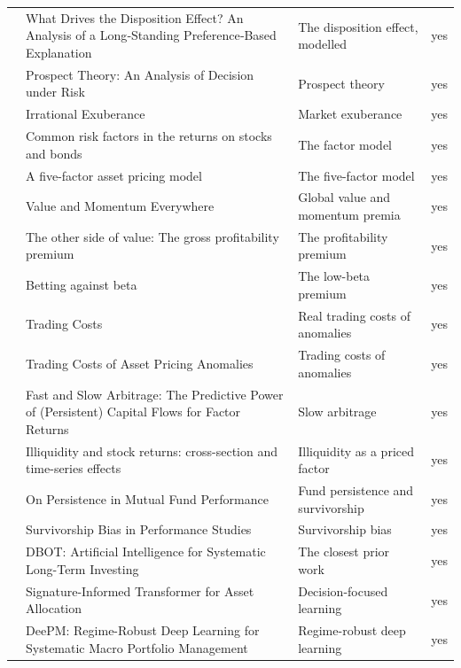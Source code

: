 \begin{tabular}{@{}P{1.32in}P{2.00in}P{0.92in}P{0.36in}@{}}
 & What Drives the Disposition Effect? An Analysis of a Long‐Standing Preference‐Based Explanation & The disposition effect, modelled & yes \\
 & Prospect Theory: An Analysis of Decision under Risk & Prospect theory & yes \\
 & Irrational Exuberance & Market exuberance & yes \\
 & Common risk factors in the returns on stocks and bonds & The factor model & yes \\
 & A five-factor asset pricing model & The five-factor model & yes \\
 & Value and Momentum Everywhere & Global value and momentum premia & yes \\
 & The other side of value: The gross profitability premium & The profitability premium & yes \\
 & Betting against beta & The low-beta premium & yes \\
 & Trading Costs & Real trading costs of anomalies & yes \\
 & Trading Costs of Asset Pricing Anomalies & Trading costs of anomalies & yes \\
 & Fast and Slow Arbitrage: The Predictive Power of (Persistent) Capital Flows for Factor Returns & Slow arbitrage & yes \\
 & Illiquidity and stock returns: cross-section and time-series effects & Illiquidity as a priced factor & yes \\
 & On Persistence in Mutual Fund Performance & Fund persistence and survivorship & yes \\
 & Survivorship Bias in Performance Studies & Survivorship bias & yes \\
 & DBOT: Artificial Intelligence for Systematic Long-Term Investing & The closest prior work & yes \\
 & Signature-Informed Transformer for Asset Allocation & Decision-focused learning & yes \\
 & DeePM: Regime-Robust Deep Learning for Systematic Macro Portfolio Management & Regime-robust deep learning & yes \\

\end{tabular}
